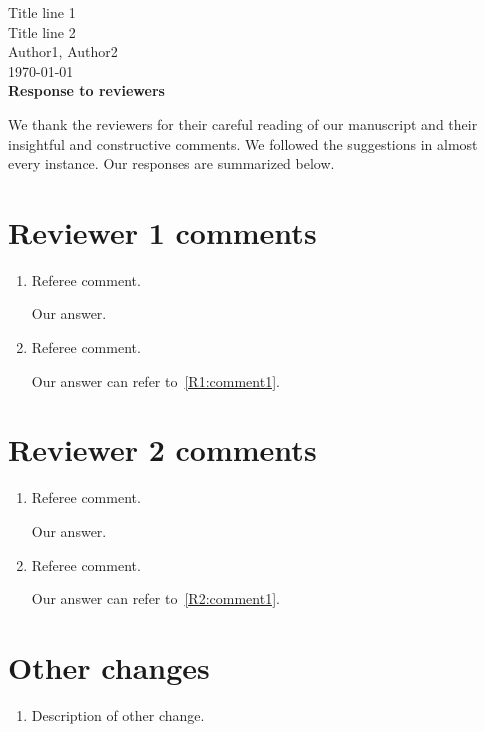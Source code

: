 \documentclass[11pt]{article}
\begin{document}
\begin{center}%
  \Large
  Title line 1
  \\ Title line 2
  \\[6pt] \large Author1, Author2
  \\[6pt] \today
  \\[12pt]\Large \bf Response to reviewers
\end{center}

\noindent We thank the reviewers for their careful reading of our manuscript and their insightful and constructive comments.
We followed the suggestions in almost every instance.
Our responses are summarized below.

\section*{Reviewer 1 comments}

\begin{enumerate}[label={\color{black}R1.\arabic*}%
  ]
  \item
    \label{R1:comment1}%
    Referee comment.

    \begin{answer}
      Our answer.
    \end{answer}

  \item Referee comment.

    \begin{answer}
      Our answer can refer to~\ref{R1:comment1}.
    \end{answer}

\end{enumerate}

%

\section*{Reviewer 2 comments}

\begin{enumerate}[label={\color{black}R2.\arabic*}%
  ]

  \item
    \label{R2:comment1}%
    Referee comment.

    \begin{answer}
      Our answer.
    \end{answer}

  \item Referee comment.

    \begin{answer}
      Our answer can refer to~\ref{R2:comment1}.
    \end{answer}

\end{enumerate}

%

\section*{Other changes}

\begin{enumerate}[label={\color{black}O.\arabic*}%
  ]

  \item Description of other change.

\end{enumerate}

% 
% 
\end{document}
